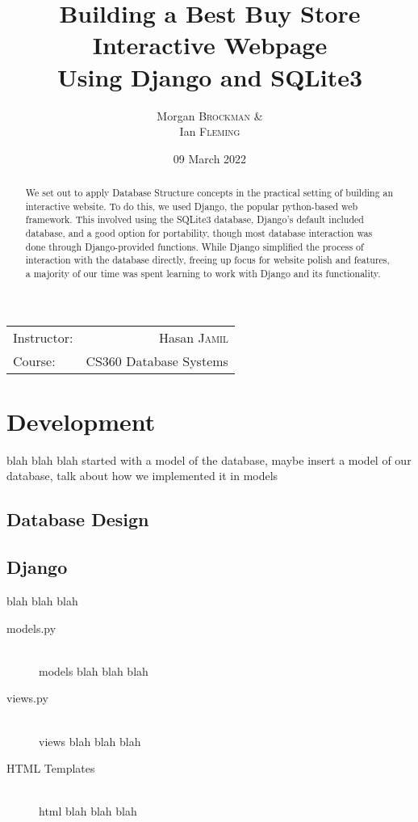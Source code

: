 \documentclass[
	letterpaper, %
	11pt, %
]{CSUniSchoolLabReport}
\title{Building a Best Buy Store \\ Interactive Webpage \\ Using Django and SQLite3} %
\author{Morgan \textsc{Brockman} \& \\ Ian \textsc{Fleming}} %
\date{09 March 2022} %
\begin{document}
\maketitle %

\begin{center}
	\begin{tabular}{l r}
		Instructor: & Hasan \textsc{Jamil} \\ %
		Course: & CS360 Database Systems
	\end{tabular}
\end{center}

\begin{abstract}
	We set out to apply Database Structure concepts in the practical setting of building an interactive website. To do this, we used Django, the popular python-based web framework. This involved using the SQLite3 database, Django's default included database, and a good option for portability, though most database interaction was done through Django-provided functions. While Django simplified the process of interaction with the database directly, freeing up focus for website polish and features, a majority of our time was spent learning to work with Django and its functionality.
\end{abstract}

\section{Development}\label{development}

blah blah blah started with a model of the database, maybe insert a model of our database, talk about how we implemented it in models

\subsection{Database Design}\label{database}

\subsection{Django}\label{django}

blah blah blah

\begin{description}
	\item[models.py] \hfill \\
	models blah blah blah
	\item[views.py] \hfill \\
	views blah blah blah
	\item[HTML Templates] \hfill \\
	html blah blah blah
\end{description}
\end{document}
